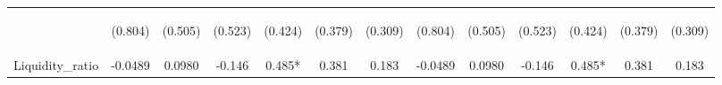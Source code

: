 \documentclass[]{article}
\begin{document}
\begin{center}
\begin{tabular}{lcccccccccccc}
\vspace{4pt} & \begin{footnotesize}(0.804)\end{footnotesize} & \begin{footnotesize}(0.505)\end{footnotesize} & \begin{footnotesize}(0.523)\end{footnotesize} & \begin{footnotesize}(0.424)\end{footnotesize} & \begin{footnotesize}(0.379)\end{footnotesize} & \begin{footnotesize}(0.309)\end{footnotesize} & \begin{footnotesize}(0.804)\end{footnotesize} & \begin{footnotesize}(0.505)\end{footnotesize} & \begin{footnotesize}(0.523)\end{footnotesize} & \begin{footnotesize}(0.424)\end{footnotesize} & \begin{footnotesize}(0.379)\end{footnotesize} & \begin{footnotesize}(0.309)\end{footnotesize} \\
Liquidity\_ratio & -0.0489 & 0.0980 & -0.146 & 0.485* & 0.381 & 0.183 & -0.0489 & 0.0980 & -0.146 & 0.485* & 0.381 & 0.183 \\

\end{tabular}
\end{center}
\end{document}
